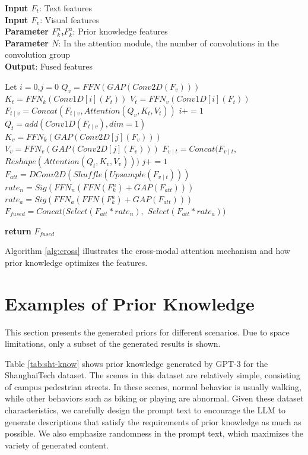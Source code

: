 \begin{algorithm}[htb]
\caption{Algorithm for cross-modal attention with prior knowledge}
\label{alg:cross}
\textbf{Input $F_{t}$}: Text features\\
\textbf{Input $F_{v}$}: Visual features\\
\textbf{Parameter $F_{k}^{n}$,$F_{k}^{a}$}: Prior knowledge features\\
\textbf{Parameter $N$}: In the attention module, the number of convolutions in the convolution group\\
\textbf{Output}: Fused features\\
\begin{algorithmic}[1] %
\STATE Let $i=0$,$j=0$
\STATE $Q_{v} = FFN(GAP(Conv2D(F_{v})))$
\STATE $K_{t} = FFN_{k}(Conv1D[i](F_{t}))$
\STATE $V_{t} = FFN_{v}(Conv1D[i](F_{t}))$
\STATE $F_{t \mid v} = Concat(F_{t \mid v}, Attention(Q_{v}, K_{t}, V_{t}))$
\STATE $i += 1$
\ENDWHILE
\STATE $Q_{t} = add(Conv1D(F_{t \mid v}), dim=1)$
\STATE $K_{v} = FFN_{k}(GAP(Conv2D[j](F_{v})))$
\STATE $V_{v} = FFN_{v}(GAP(Conv2D[j](F_{v})))$
\STATE $F_{v \mid t} = Concat(F_{v \mid t}, $
\STATE \quad \quad \quad $Reshape(Attention(Q_{t}, K_{v}, V_{v})))$
\STATE $j += 1$
\ENDWHILE
\STATE $F_{att} = DConv2D(Shuffle(Upsample(F_{v \mid t})))$
\STATE $rate_{n} = Sig(FFN_{n}(FFN(F_{k}^{n}) + GAP(F_{att})))$
\STATE $rate_{a} = Sig(FFN_{a}(FFN(F_{k}^{a}) + GAP(F_{att})))$
\STATE $F_{fused} = Concat(Select(F_{att}*rate_{n}), $
\STATE \quad \quad \quad \quad \quad \quad \quad \quad $Select(F_{att}*rate_{a}))$

\STATE \textbf{return} $F_{fused}$
\end{algorithmic}
\end{algorithm}

Algorithm \ref{alg:cross} illustrates the cross-modal attention mechanism and how prior knowledge optimizes the features.


\section{Examples of Prior Knowledge}

This section presents the generated priors for different scenarios. Due to space limitations, only a subset of the generated results is shown.

Table \ref{tab:sht-know} shows prior knowledge generated by GPT-3 for the ShanghaiTech dataset. The scenes in this dataset are relatively simple, consisting of campus pedestrian streets. In these scenes, normal behavior is usually walking, while other behaviors such as biking or playing are abnormal. Given these dataset characteristics, we carefully design the prompt text to encourage the LLM to generate descriptions that satisfy the requirements of prior knowledge as much as possible. We also emphasize randomness in the prompt text, which maximizes the variety of generated content.

